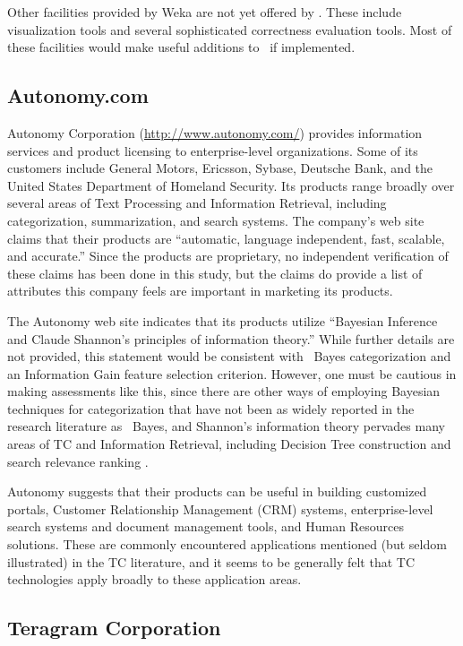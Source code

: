 Other facilities provided by Weka are not yet offered by
\aicat.  These include visualization tools and several
sophisticated correctness evaluation tools.  Most of these
facilities would make useful additions to \aicat\ if
implemented.

\subsection{Autonomy.com}

Autonomy Corporation (\url{http://www.autonomy.com/}) provides
information services and product licensing to enterprise-level
organizations.  Some of its customers include General Motors,
Ericsson, Sybase, Deutsche Bank, and the United States Department of
Homeland Security.  Its products range broadly over several areas of
Text Processing and Information Retrieval, including categorization,
summarization, and search systems.  The company's web site claims that
their products are ``automatic, language independent, fast, scalable,
and accurate.''  Since the products are proprietary, no independent
verification of these claims has been done in this study, but the
claims do provide a list of attributes this company feels are
important in marketing its products.

The Autonomy web site indicates that its products utilize ``Bayesian
Inference and Claude Shannon's principles of information theory.''
While further details are not provided, this statement would be
consistent with \naive\ Bayes categorization and an Information Gain
feature selection criterion.  However, one must be cautious in making
assessments like this, since there are other ways of employing
Bayesian techniques for categorization that have not been as widely
reported in the research literature as \naive\ Bayes, and Shannon's
information theory pervades many areas of TC and Information
Retrieval, including Decision Tree construction
\cite{quinlan:89,wallace:93} and search relevance ranking
\cite{greiff:00}.

Autonomy suggests that their products can be useful in building
customized portals, Customer Relationship Management (CRM) systems,
enterprise-level search systems and document management tools, and
Human Resources solutions.  These are commonly encountered
applications mentioned (but seldom illustrated) in the TC literature,
and it seems to be generally felt that TC technologies apply broadly
to these application areas.

\subsection{Teragram Corporation}

